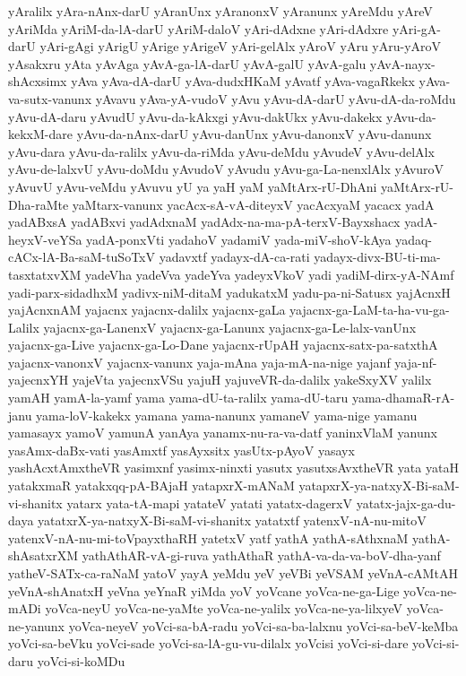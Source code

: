 {yAralilx
yAra-nAnx-darU
yAranUnx
yAranonxV
yAranunx
yAreMdu
yAreV
yAriMda
yAriM-da-lA-darU
yAriM-daloV
yAri-dAdxne
yAri-dAdxre
yAri-gA-darU
yAri-gAgi
yArigU
yArige
yArigeV
yAri-gelAlx
yAroV
yAru
yAru-yAroV
yAsakxru
yAta
yAvAga
yAvA-ga-lA-darU
yAvA-galU
yAvA-galu
yAvA-nayx-shAcxsimx
yAva
yAva-dA-darU
yAva-dudxHKaM
yAvatf
yAva-vagaRkekx
yAva-va-sutx-vanunx
yAvavu
yAva-yA-vudoV
yAvu
yAvu-dA-darU
yAvu-dA-da-roMdu
yAvu-dA-daru
yAvudU
yAvu-da-kAkxgi
yAvu-dakUkx
yAvu-dakekx
yAvu-da-kekxM-dare
yAvu-da-nAnx-darU
yAvu-danUnx
yAvu-danonxV
yAvu-danunx
yAvu-dara
yAvu-da-ralilx
yAvu-da-riMda
yAvu-deMdu
yAvudeV
yAvu-delAlx
yAvu-de-lalxvU
yAvu-doMdu
yAvudoV
yAvudu
yAvu-ga-La-nenxlAlx
yAvuroV
yAvuvU
yAvu-veMdu
yAvuvu
yU
ya
yaH
yaM
yaMtArx-rU-DhAni
yaMtArx-rU-Dha-raMte
yaMtarx-vanunx
yacAcx-sA-vA-diteyxV
yacAcxyaM
yacacx
yadA
yadABxsA
yadABxvi
yadAdxnaM
yadAdx-na-ma-pA-terxV-Bayxshacx
yadA-heyxV-veYSa
yadA-ponxVti
yadahoV
yadamiV
yada-miV-shoV-kAya
yadaq-cACx-lA-Ba-saM-tuSoTxV
yadavxtf
yadayx-dA-ca-rati
yadayx-divx-BU-ti-ma-tasxtatxvXM
yadeVha
yadeVva
yadeYva
yadeyxVkoV
yadi
yadiM-dirx-yA-NAmf
yadi-parx-sidadhxM
yadivx-niM-ditaM
yadukatxM
yadu-pa-ni-Satusx
yajAcnxH
yajAcnxnAM
yajacnx
yajacnx-dalilx
yajacnx-gaLa
yajacnx-ga-LaM-ta-ha-vu-ga-Lalilx
yajacnx-ga-LanenxV
yajacnx-ga-Lanunx
yajacnx-ga-Le-lalx-vanUnx
yajacnx-ga-Live
yajacnx-ga-Lo-Dane
yajacnx-rUpAH
yajacnx-satx-pa-satxthA
yajacnx-vanonxV
yajacnx-vanunx
yaja-mAna
yaja-mA-na-nige
yajanf
yaja-nf-yajecnxYH
yajeVta
yajecnxVSu
yajuH
yajuveVR-da-dalilx
yakeSxyXV
yalilx
yamAH
yamA-la-yamf
yama
yama-dU-ta-ralilx
yama-dU-taru
yama-dhamaR-rA-janu
yama-loV-kakekx
yamana
yama-nanunx
yamaneV
yama-nige
yamanu
yamasayx
yamoV
yamunA
yanAya
yanamx-nu-ra-va-datf
yaninxVlaM
yanunx
yasAmx-daBx-vati
yasAmxtf
yasAyxsitx
yasUtx-pAyoV
yasayx
yashAcxtAmxtheVR
yasimxnf
yasimx-ninxti
yasutx
yasutxsAvxtheVR
yata
yataH
yatakxmaR
yatakxqq-pA-BAjaH
yatapxrX-mANaM
yatapxrX-ya-natxyX-Bi-saM-vi-shanitx
yatarx
yata-tA-mapi
yatateV
yatati
yatatx-dagerxV
yatatx-jajx-ga-du-daya
yatatxrX-ya-natxyX-Bi-saM-vi-shanitx
yatatxtf
yatenxV-nA-nu-mitoV
yatenxV-nA-nu-mi-toVpayxthaRH
yatetxV
yatf
yathA
yathA-sAthxnaM
yathA-shAsatxrXM
yathAthAR-vA-gi-ruva
yathAthaR
yathA-va-da-va-boV-dha-yanf
yatheV-SATx-ca-raNaM
yatoV
yayA
yeMdu
yeV
yeVBi
yeVSAM
yeVnA-cAMtAH
yeVnA-shAnatxH
yeVna
yeYnaR
yiMda
yoV
yoVcane
yoVca-ne-ga-Lige
yoVca-ne-mADi
yoVca-neyU
yoVca-ne-yaMte
yoVca-ne-yalilx
yoVca-ne-ya-lilxyeV
yoVca-ne-yanunx
yoVca-neyeV
yoVci-sa-bA-radu
yoVci-sa-ba-lalxnu
yoVci-sa-beV-keMba
yoVci-sa-beVku
yoVci-sade
yoVci-sa-lA-gu-vu-dilalx
yoVcisi
yoVci-si-dare
yoVci-si-daru
yoVci-si-koMDu
}
